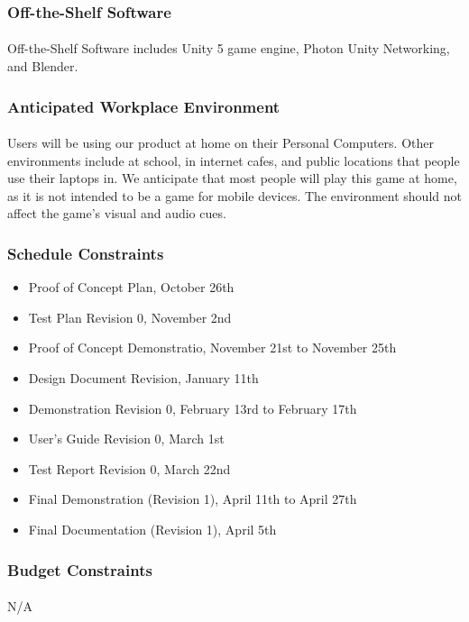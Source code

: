 \documentclass[12pt, titlepage]{article}
\begin{document}
\subsubsection{Off-the-Shelf Software}
\paragraph{}Off-the-Shelf Software includes Unity 5 game engine, Photon Unity Networking, and Blender.
\subsubsection{Anticipated Workplace Environment}
\paragraph{}Users will be using our product at home on their Personal Computers. Other environments include at school, in internet cafes, and public locations that people use their laptops in. We anticipate that most people will play this game at home, as it is not intended to be a game for mobile devices. The environment should not affect the game's visual and audio cues. 
\subsubsection{Schedule Constraints}
\begin{itemize}
    \item Proof of Concept Plan, October 26th
    \item Test Plan Revision 0, November 2nd
    \item Proof of Concept Demonstratio, November 21st to November 25th
    \item Design Document Revision, January 11th
    \item Demonstration Revision 0, February 13rd to February 17th
    \item User’s Guide Revision 0, March 1st
    \item Test Report Revision 0, March 22nd
    \item Final Demonstration (Revision 1), April 11th to April 27th
    \item Final Documentation (Revision 1), April 5th
\end{itemize}
\subsubsection{Budget Constraints}
\paragraph{}N/A
\end{document}
